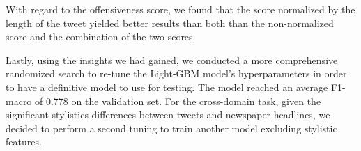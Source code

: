 With regard to the offensiveness score, we found that the score normalized by the length of the tweet yielded better results than both than the non-normalized score and the combination of the two scores.

Lastly, using the insights we had gained, we conducted a more comprehensive randomized search to re-tune the Light-GBM model's hyperparameters in order to have a definitive model to use for testing. The model reached an average F1-macro of 0.778 on the validation set. For the cross-domain task, given the significant stylistics differences between tweets and newspaper headlines, we decided to perform a second tuning to train another model excluding stylistic features.
